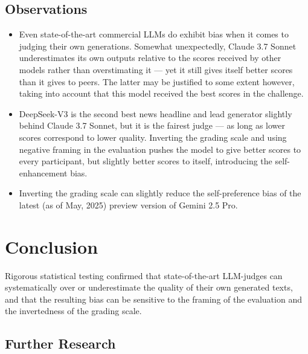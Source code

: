 \documentclass[UTF8,noindent,nohyp,parspace,titlepage,twoside,12pt]{article}
\begin{document}
    \subsection{Observations}

      \begin{itemize}
        \item Even state-of-the-art commercial LLMs do exhibit bias when it
              comes to judging their own generations. Somewhat unexpectedly,
              Claude 3.7 Sonnet underestimates its own outputs relative to the
              scores received by other models rather than overstimating it ---
              yet it still gives itself better scores than it gives to peers.
              The latter may be justified to some extent however, taking into
              account that this model received the best scores in the
              challenge.

        \item DeepSeek-V3 is the second best news headline and lead generator
              slightly behind Claude 3.7 Sonnet, but it is the fairest judge
              --- as long as lower scores correspond to lower quality. Inverting
              the grading scale and using negative framing in the evaluation
              pushes the model to give better scores to every participant, but
              slightly better scores to itself, introducing the
              self-enhancement bias.

        \item Inverting the grading scale can slightly reduce the
              self-preference bias of the latest (as of May, 2025) preview
              version of Gemini 2.5 Pro.
      \end{itemize}

  \section{Conclusion}

    Rigorous statistical testing confirmed that state-of-the-art LLM-judges can
    systematically over or underestimate the quality of their own generated
    texts, and that the resulting bias can be sensitive to the framing of the
    evaluation and the invertedness of the grading scale.

    \subsection{Further Research}
\end{document}
